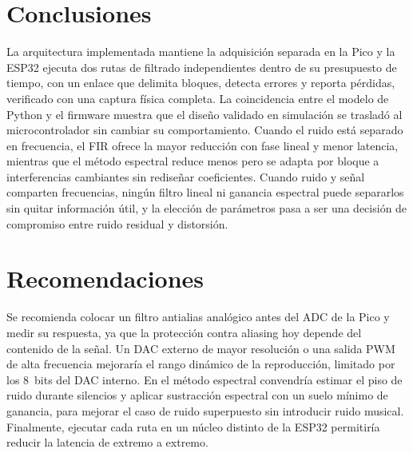 \documentclass[conference]{IEEEtran}
\begin{document}
\section{Conclusiones}\label{sec:conclusiones}
La arquitectura implementada mantiene la adquisición separada en
la Pico y la ESP32 ejecuta dos rutas de filtrado independientes dentro de su
presupuesto de tiempo, con un enlace que delimita bloques, detecta errores y reporta
pérdidas, verificado con una captura física completa. La coincidencia entre el modelo de Python y el firmware muestra que el diseño
validado en simulación se trasladó al microcontrolador sin cambiar su comportamiento.
Cuando el ruido está separado en frecuencia, el FIR ofrece la mayor reducción con fase
lineal y menor latencia, mientras que el método espectral reduce menos pero se adapta
por bloque a interferencias cambiantes sin rediseñar coeficientes. Cuando ruido y señal
comparten frecuencias, ningún filtro lineal ni ganancia espectral puede separarlos sin
quitar información útil, y la elección de parámetros pasa a ser una decisión de
compromiso entre ruido residual y distorsión.

\section{Recomendaciones}\label{sec:recomendaciones}
Se recomienda colocar un filtro antialias analógico antes del ADC de la Pico y medir su
respuesta, ya que la protección contra aliasing hoy depende del contenido de la señal.
Un DAC externo de mayor resolución o una salida PWM de alta frecuencia mejoraría el
rango dinámico de la reproducción, limitado por los 8~bits del DAC interno. En el
método espectral convendría estimar el piso de ruido durante silencios y aplicar
sustracción espectral con un suelo mínimo de ganancia, para mejorar el caso de ruido
superpuesto sin introducir ruido musical. Finalmente, ejecutar cada ruta en un núcleo
distinto de la ESP32 permitiría reducir la latencia de extremo a extremo.




\appendices
\end{document}
